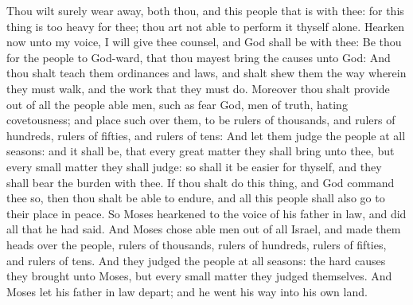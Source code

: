 \begin{biblechapter}
\verse Thou wilt surely wear away, both thou, and this people that is with thee: for this thing is too heavy for thee; thou art not able to perform it thyself alone.
\verse Hearken now unto my voice, I will give thee counsel, and God shall be with thee: Be thou for the people to God-ward, that thou mayest bring the causes unto God:
\verse And thou shalt teach them ordinances and laws, and shalt shew them the way wherein they must walk, and the work that they must do.
\verse Moreover thou shalt provide out of all the people able men, such as fear God, men of truth, hating covetousness; and place such over them, to be rulers of thousands, and rulers of hundreds, rulers of fifties, and rulers of tens:
\verse And let them judge the people at all seasons: and it shall be, that every great matter they shall bring unto thee, but every small matter they shall judge: so shall it be easier for thyself, and they shall bear the burden with thee.
\verse If thou shalt do this thing, and God command thee so, then thou shalt be able to endure, and all this people shall also go to their place in peace.
\verse So Moses hearkened to the voice of his father in law, and did all that he had said.
\verse And Moses chose able men out of all Israel, and made them heads over the people, rulers of thousands, rulers of hundreds, rulers of fifties, and rulers of tens.
\verse And they judged the people at all seasons: the hard causes they brought unto Moses, but every small matter they judged themselves.
\verse And Moses let his father in law depart; and he went his way into his own land.
\end{biblechapter}

